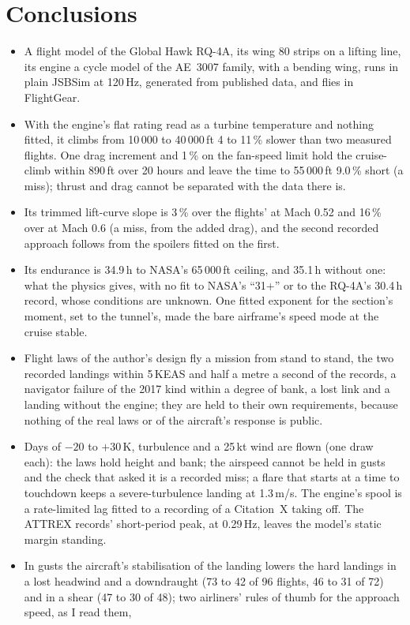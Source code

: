 \documentclass[10pt,a4paper,twocolumn]{article}
\begin{document}
\section{Conclusions}\label{sec:concl}
\begin{itemize}
\item A flight model of the Global Hawk RQ-4A, its wing 80 strips on a lifting line, its engine a cycle model of the AE~3007 family, with a bending
wing, runs in plain JSBSim at 120\,Hz, generated from published data, and flies in FlightGear.
\item With the engine's flat rating read as a turbine temperature and nothing fitted, it climbs from 10\,000 to 40\,000\,ft 4 to 11\,\% slower
than two measured flights. One drag increment and 1\,\% on the fan-speed limit hold the cruise-climb within
890\,ft over 20 hours and leave the time to 55\,000\,ft 9.0\,\% short (a miss); thrust and drag cannot be separated with the data there is.
\item Its trimmed lift-curve slope is 3\,\% over the flights' at Mach 0.52 and 16\,\% over at Mach 0.6 (a miss, from the added drag), and the second recorded approach follows from the spoilers fitted on the first.
\item Its endurance is 34.9\,h to NASA's 65\,000\,ft ceiling, and 35.1\,h without one: what the physics gives, with no fit to NASA's ``31+'' or to the
RQ-4A's 30.4\,h record, whose conditions are unknown. One fitted exponent for the section's moment, set to the tunnel's, made the bare airframe's speed mode at the cruise stable.
\item Flight laws of the author's design fly a mission from stand to stand, the two recorded landings within 5\,KEAS and half a metre a second of the
records, a navigator failure of the 2017 kind within a degree of bank, a lost link and a landing without the engine; they are held to their own
requirements, because nothing of the real laws or of the aircraft's response is public.
\item Days of $-20$ to $+30$\,K, turbulence and a 25\,kt wind are flown (one draw each): the laws hold height and bank; the airspeed cannot be held in gusts and the check that asked
it is a recorded miss; a flare that starts at a time to touchdown keeps a severe-turbulence landing at 1.3\,m/s. The engine's spool is a rate-limited lag fitted to a recording of a
Citation~X taking off. The ATTREX records' short-period peak, at 0.29\,Hz, leaves the model's static margin standing.
\item In gusts the aircraft's stabilisation of the landing lowers the hard landings in a lost headwind and a downdraught (73 to 42 of 96 flights, 46 to 31 of 72) and in a shear (47 to 30 of 48); two airliners' rules of thumb for the approach speed, as I read them,

\end{itemize}
\end{document}

